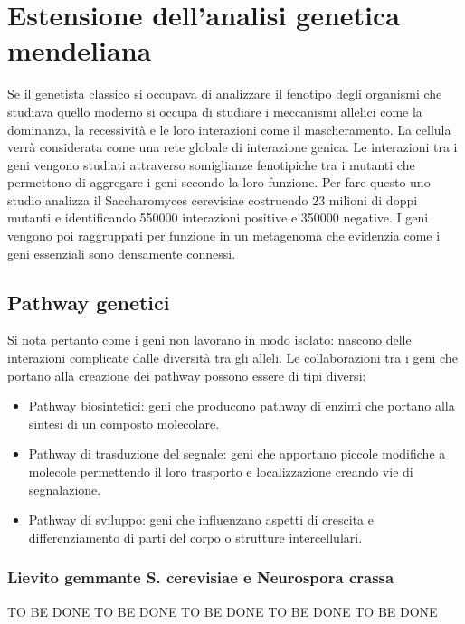 \chapter{Estensione dell'analisi genetica mendeliana}
Se il genetista classico si occupava di analizzare il fenotipo degli organismi che studiava quello moderno si occupa di studiare i meccanismi allelici come la dominanza, la 
recessivit\`a e le loro interazioni come il mascheramento. La cellula verr\`a considerata come una rete globale di interazione genica. Le interazioni tra i geni vengono studiati 
attraverso somiglianze fenotipiche tra i mutanti che permettono di aggregare i geni secondo la loro funzione. Per fare questo uno studio analizza il Saccharomyces cerevisiae costruendo
$23$ milioni di doppi mutanti e identificando \num{550000} interazioni positive e \num{350000} negative. I geni vengono poi raggruppati per funzione in un metagenoma che
evidenzia come i geni essenziali sono densamente connessi. 
\section{Pathway genetici}
Si nota pertanto come i geni non lavorano in modo isolato: nascono delle interazioni complicate dalle diversit\`a tra gli alleli. Le collaborazioni tra i geni che portano alla
creazione dei pathway possono essere di tipi diversi:
\begin{itemize}
	\item Pathway biosintetici: geni che producono pathway di enzimi che portano alla sintesi di un composto molecolare.
	\item Pathway di trasduzione del segnale: geni che apportano piccole modifiche a molecole permettendo il loro trasporto e localizzazione creando vie di segnalazione.
	\item Pathway di sviluppo: geni che influenzano aspetti di crescita e differenziamento di parti del corpo o strutture intercellulari.
\end{itemize}
\subsection{Lievito gemmante S. cerevisiae e Neurospora crassa}
TO BE DONE TO BE DONE TO BE DONE TO BE DONE TO BE DONE\\\\\\\\

